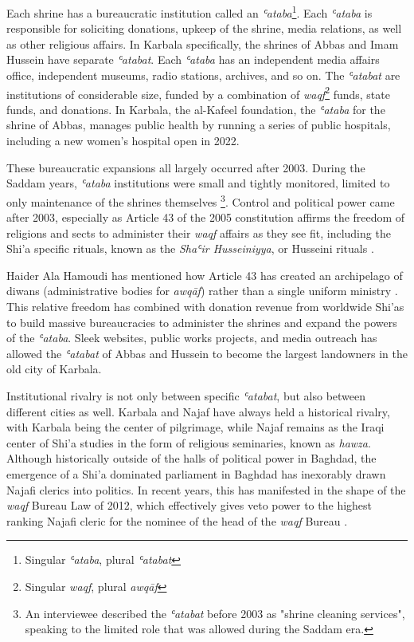 Each shrine has a bureaucratic institution called an \emph{ʿataba}\footnote{Singular \emph{ʿataba}, plural \emph{ʿatabat}}. Each \emph{ʿataba} is responsible for soliciting donations, upkeep of the shrine, media relations, as well as other religious affairs. In Karbala specifically, the shrines of Abbas and Imam Hussein have separate \emph{ʿatabat}. Each \emph{ʿataba} has an independent media affairs office, independent museums, radio stations, archives, and so on. The \emph{ʿatabat} are institutions of considerable size, funded by a combination of \emph{waqf}\footnote{Singular \emph{waqf}, plural \emph{awqāf}} funds, state funds, and donations. In Karbala, the al-Kafeel foundation, the \emph{ʿataba} for the shrine of Abbas, manages public health by running a series of public hospitals, including a new women's hospital open in 2022. 

These bureaucratic expansions all largely occurred after 2003. During the Saddam years, \emph{ʿataba} institutions were small and tightly monitored, limited to only maintenance of the shrines themselves \footnote{An interviewee described the \emph{ʿatabat} before 2003 as "shrine cleaning services", speaking to the limited role that was allowed during the Saddam era.}. Control and political power came after 2003, especially as Article 43 of the 2005 constitution affirms the freedom of religions and sects to administer their \emph{waqf} affairs as they see fit, including the Shi'a specific rituals, known as the \emph{Shaʿir Husseiniyya}, or Husseini rituals \cite{jawad_iraqi_2003}. 

Haider Ala Hamoudi has mentioned how Article 43 has created an archipelago of diwans (administrative bodies for \emph{awqāf}) rather than a single uniform ministry \cite[220]{hamoudi_engagements_2020}. This relative freedom has combined with donation revenue from worldwide Shi'as to build massive bureaucracies to administer the shrines and expand the powers of the \emph{ʿataba}. Sleek websites, public works projects, and media outreach has allowed the \emph{ʿatabat} of Abbas and Hussein to become the largest landowners in the old city of Karbala. 

Institutional rivalry is not only between specific \emph{ʿatabat}, but also between different cities as well. Karbala and Najaf have always held a historical rivalry, with Karbala being the center of pilgrimage, while Najaf remains as the Iraqi center of Shi'a studies in the form of religious seminaries, known as \emph{hawza}. Although historically outside of the halls of political power in Baghdad, the emergence of a Shi'a dominated parliament in Baghdad has inexorably drawn Najafi clerics into politics. In recent years, this has manifested in the shape of the \emph{waqf} Bureau Law of 2012, which effectively gives veto power to the highest ranking Najafi cleric for the nominee of the head of the \emph{waqf} Bureau \cite{hamoudi_engagements_2020}.

